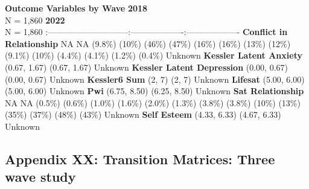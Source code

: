 \documentclass[
  singlecolumn]{article}
\begin{document}
\textbar{}\textbf{Outcome Variables by Wave} \textbar{}\textbf{2018}\\
N = 1,860 \textbar{}\textbf{2022}\\
N = 1,860 \textbar{}
\textbar:-----------------------------\textbar:-------------------\textbar:-------------------\textbar{}
\textbar{}\textbf{Conflict in Relationship} \textbar NA \textbar NA
\textbar{}   (9.8\%)  (10\%) \textbar{}
  (46\%)  (47\%) \textbar{} 
 (16\%)  (16\%) \textbar{}  
(13\%)  (12\%) \textbar{}   (9.1\%)
 (10\%) \textbar{}   (4.4\%) 
(4.1\%) \textbar{}   (1.2\%)  (0.4\%)
\textbar{} \textbar Unknown   \textbar{}
\textbar{}\textbf{Kessler Latent Anxiety}  (0.67, 1.67)
 (0.67, 1.67) \textbar{} \textbar Unknown 
 \textbar{} \textbar{}\textbf{Kessler Latent Depression}
 (0.00, 0.67)  (0.00, 0.67) \textbar{}
\textbar Unknown   \textbar{}
\textbar{}\textbf{Kessler6 Sum}  (2, 7)  (2, 7)
\textbar{} \textbar Unknown   \textbar{}
\textbar{}\textbf{Lifesat}  (5.00, 6.00)  (5.00,
6.00) \textbar{} \textbar Unknown   \textbar{}
\textbar{}\textbf{Pwi}  (6.75, 8.50)  (6.25,
8.50) \textbar{} \textbar Unknown   \textbar{}
\textbar{}\textbf{Sat Relationship} \textbar NA \textbar NA \textbar{}
  (0.5\%)  (0.6\%) \textbar{} 
 (1.0\%)  (1.6\%) \textbar{}  
(2.0\%)  (1.3\%) \textbar{}   (3.8\%)
 (3.8\%) \textbar{}   (10\%) 
(13\%) \textbar{}   (35\%)  (37\%)
\textbar{}   (48\%)  (43\%) \textbar{}
\textbar Unknown   \textbar{}
\textbar{}\textbf{Self Esteem}  (4.33, 6.33) 
(4.67, 6.33) \textbar{} \textbar Unknown  
\textbar{}

\subsection{Appendix XX: Transition Matrices: Three wave
study}\label{appendix-xx-transition-matrices-three-wave-study}
\end{document}
